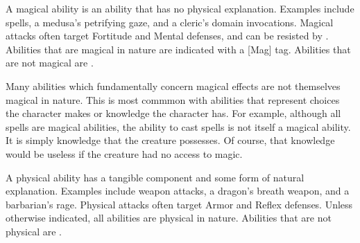     \label{Magical Abilities} A magical ability is an ability that has no physical explanation.
    Examples include spells, a medusa's petrifying gaze, and a cleric's domain invocations.
    Magical attacks often target Fortitude and Mental defenses, and can be resisted by .
    Abilities that are magical in nature are indicated with a [Mag] tag.
    Abilities that are not magical are .

    Many abilities which fundamentally concern magical effects are not themselves magical in nature.
    This is most commmon with abilities that represent choices the character makes or knowledge the character has.
    For example, although all spells are magical abilities, the ability to cast spells is not itself a magical ability.
    It is simply knowledge that the creature possesses.
    Of course, that knowledge would be useless if the creature had no access to magic.

    \label{Physical Abilities} A physical ability has a tangible component and some form of natural explanation.
    Examples include weapon attacks, a dragon's breath weapon, and a barbarian's rage.
    Physical attacks often target Armor and Reflex defenses.
    Unless otherwise indicated, all abilities are physical in nature.
    Abilities that are not physical are .
